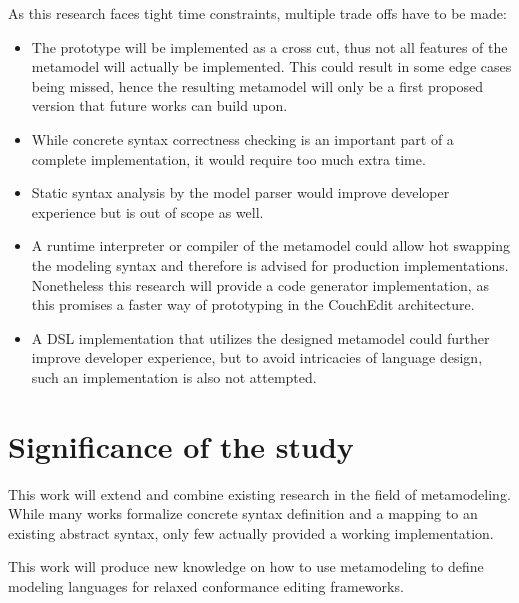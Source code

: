 \documentclass[10pt,a4paper,oneside]{scrartcl}
\newcommand\hint[2]{
\ifthenelse{\boolean{showhints}}{
\begin{center}
\colorbox{black!10}{
\begin{minipage}{.963\textwidth}
#2\hfill\textbf{#1}
\end{minipage}
}\end{center}}{}
}
\begin{document}
As this research faces tight time constraints, multiple trade offs have to be made:

\begin{itemize}
  \item The prototype will be implemented as a cross cut, thus not all features of the metamodel will actually be implemented. This could result in some edge cases being missed, hence the resulting metamodel will only be a first proposed version that future works can build upon.
  \item While concrete syntax correctness checking is an important part of a complete implementation, it would require too much extra time.
  \item Static syntax analysis by the model parser would improve developer experience but is out of scope as well.
  \item A runtime interpreter or compiler of the metamodel could allow hot swapping the modeling syntax and therefore is advised for production implementations. Nonetheless this research will provide a code generator implementation, as this promises a faster way of prototyping in the CouchEdit architecture.
  \item A DSL implementation that utilizes the designed metamodel could further improve developer experience, but to avoid intricacies of language design, such an implementation is also not attempted. 
\end{itemize}

\section{Significance of the study}


This work will extend and combine existing research in the field of metamodeling. While many works formalize concrete syntax definition and a mapping to an existing abstract syntax, only few actually provided a working implementation.

This work will produce new knowledge on how to use metamodeling to define modeling languages for relaxed conformance editing frameworks.
\end{document}
